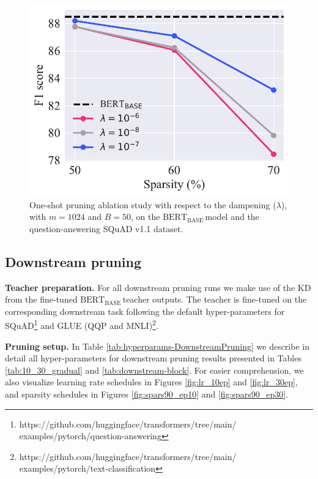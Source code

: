 \documentclass[11pt]{article}
\newcommand{\bert}{$\textrm{BERT}_{\textrm{BASE}}\,$}
\begin{document}
\begin{figure}
    \centering
    \includegraphics[scale=0.5]{media/ablation_damp.pdf}
    \caption{One-shot pruning ablation study with respect to the dampening ($\lambda$), with $m = 1024$ and $B = 50$, on the \bert model and the question-answering SQuAD v1.1 dataset.}
    \label{fig:ablation_damp}
\end{figure}

\subsection{Downstream pruning}
\label{app:hyperparams-DownstreamPruning}

\noindent\textbf{Teacher preparation.} For all downstream pruning runs we make use of the KD from the fine-tuned \bert teacher outputs. The teacher is fine-tuned on the corresponding downstream task following the default hyper-parameters for SQuAD\footnote{https://github.com/huggingface/transformers/tree/main/\\examples/pytorch/question-answering} and GLUE (QQP and MNLI)\footnote{https://github.com/huggingface/transformers/tree/main/\\examples/pytorch/text-classification}. 

\noindent\textbf{Pruning setup.} In Table \ref{tab:hyperparams-DownstreamPruning} we describe in detail all hyper-parameters for downstream pruning results presented in Tables \ref{tab:10_30_gradual} and \ref{tab:downstream-block}. For easier comprehension, we also visualize learning rate schedules in Figures \ref{fig:lr_10ep} and \ref{fig:lr_30ep}, and sparsity schedules in Figures \ref{fig:spars90_ep10} and \ref{fig:spars90_ep30}. 
\end{document}
